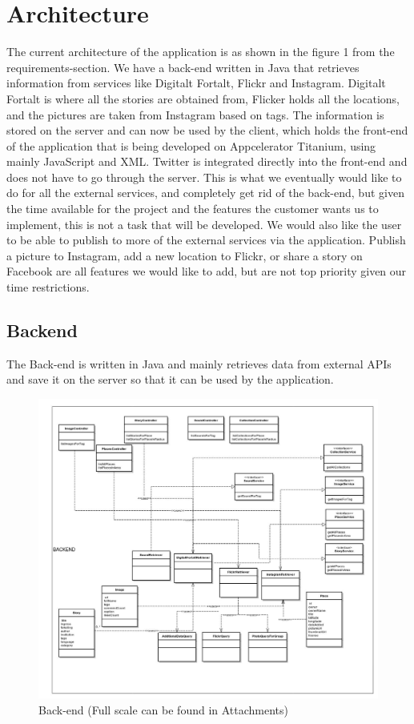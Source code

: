 \section{Architecture}
\thispagestyle{plain}

The current architecture of the application is as shown in the figure 1 from the requirements-section. We have a back-end written in Java that retrieves information from services like Digitalt Fortalt, Flickr and Instagram. Digitalt Fortalt is where all the stories are obtained from, Flicker holds all the locations, and the pictures are taken from Instagram based on tags. The information is stored on the server and can now be used by the client, which holds the front-end of the application that is being developed on Appcelerator Titanium, using mainly JavaScript and XML. Twitter is integrated directly into the front-end and does not have to go through the server. This is what we eventually would like to do for all the external services, and completely get rid of the back-end, but given the time available for the project and the features the customer wants us to implement, this is not a task that will be developed. We would also like the user to be able to publish to more of the external services via the application. Publish a picture to Instagram, add a new location to Flickr, or share a story on Facebook are all features we would like to add, but are not top priority given our time restrictions.

\subsection{Backend}
The Back-end is written in Java and mainly retrieves data from external APIs and save it on the server so that it can be used by the application.

\begin{figure}[!h]
\begin{center}
\includegraphics[scale=0.1]{class-backend.jpg}
\caption{Back-end (Full scale can be found in Attachments) }
\end{center}
\end{figure}

